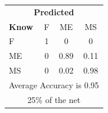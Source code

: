 \documentclass[12pt]{article} %
\begin{document}
\begin{minipage}{0.5\textwidth}
\begin{center}
\begin{tabular}{l|c|c|c|}
 \multicolumn{4}{c}{ \textbf{ Predicted}}\\
 \textbf{Know}&F&ME&MS\\ \hline\hline
F   &1&0&0\\
ME &0&0.89&0.11\\
MS &0&0.02&0.98\\
\multicolumn{4}{c}{Average Accuracy is 0.95}\\
\multicolumn{4}{c}{25\%  of the net}\\
\end{tabular}
\end{center}
\end{minipage}
\end{document}
